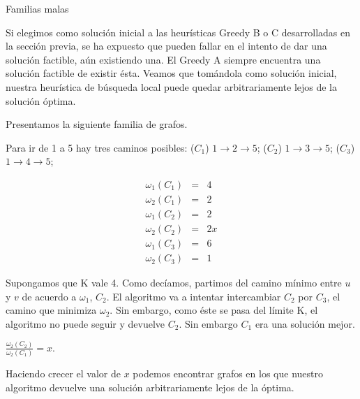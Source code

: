 Familias malas

Si elegimos como solución inicial a las heurísticas Greedy B o C desarrolladas en la sección previa, se ha expuesto que pueden fallar en el
intento de dar una solución factible, aún existiendo una. El Greedy A siempre encuentra una solución factible de existir ésta. Veamos que
tomándola como solución inicial, nuestra heurística de búsqueda local puede quedar arbitrariamente lejos de la solución óptima.

Presentamos la siguiente familia de grafos.


Para ir de 1 a 5 hay tres caminos posibles: ($C_1$) $1 \rightarrow 2 \rightarrow 5$; ($C_2$) $1 \rightarrow 3 \rightarrow 5$;
($C_3$) $1 \rightarrow 4 \rightarrow 5$;

\begin{eqnarray}
 \omega_1(C_1) &=& 4	\\ 
 \omega_2(C_1) &=& 2	\\
 \omega_1(C_2) &=& 2	\\
 \omega_2(C_2) &=& 2x   \\
 \omega_1(C_3) &=& 6	\\
 \omega_2(C_3) &=& 1
\end{eqnarray}

Supongamos que K vale 4.
Como decíamos, partimos del camino mínimo entre $u$ y $v$ de acuerdo a $\omega_1$, $C_2$. El algoritmo va a intentar intercambiar $C_2$ por
$C_3$, el camino que minimiza $\omega_2$. Sin embargo, como éste se pasa del límite K, el algoritmo no puede seguir y devuelve $C_2$. Sin
embargo $C_1$ era una solución mejor.

$\frac{\omega_2(C_2)}{\omega_2(C_1)} = x$.

Haciendo crecer el valor de $x$ podemos encontrar grafos en los que nuestro algoritmo devuelve una
solución arbitrariamente lejos de la óptima.
